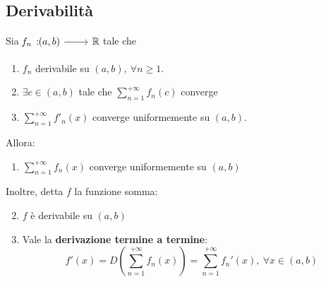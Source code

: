 \subsection{Derivabilità}
\begin{theorema}\label{derivabilitatermineatermine}
	Sia $\funz{f_n}{\left(a,b\right)}{\realset}$ tale che
	\begin{enumerate}
		\item $f_n$ derivabile su $\left(a,b\right),\ \forall n\geq 1$.
		\item $\exists c\in\left(a,b\right)$ tale che $\displaystyle\sum_{n=1}^{+\infty}f_n\left(c\right)$ converge
		\item $\displaystyle\sum_{n=1}^{+\infty}f'_n(x)$ converge uniformemente su $\left(a,b\right)$.
	\end{enumerate}
Allora:
\begin{enumerate}
	\item $\displaystyle\sum_{n=1}^{+\infty}f_n(x)$ converge uniformemente su $\left(a,b\right)$
\end{enumerate}
Inoltre, detta $f$ la funzione somma:
\begin{enumerate}
		\setcounter{enumi}{1}
\item $f$ è derivabile su $\left(a,b\right)$
\item Vale la \textbf{derivazione termine a termine}:
\begin{equation}
	f'(x)=D\left(\sum_{n=1}^{+\infty}f_n(x)\right)=\sum_{n=1}^{+\infty}f_n'(x),\ \forall x\in\left(a,b\right)
\end{equation}
\end{enumerate}
\end{theorema}
